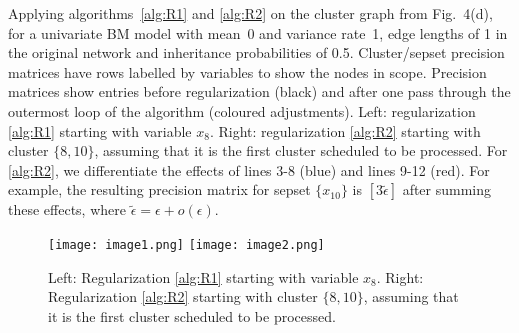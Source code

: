 \documentclass{article}
\begin{document}
Applying algorithms~\ref{alg:R1} and \ref{alg:R2} on the cluster graph from Fig.~4(d), for a univariate BM model with mean~0 and variance rate~1, edge lengths of 1 in the original network and inheritance probabilities of 0.5. Cluster/sepset precision matrices have rows labelled by variables to show the nodes in scope. Precision matrices show entries before regularization (black) and after one pass through the outermost loop of the algorithm (coloured adjustments). Left: regularization \ref{alg:R1} starting with variable $x_8$. Right: regularization \ref{alg:R2} starting with cluster $\{8, 10\}$, assuming that it is the first cluster scheduled to be processed. For \ref{alg:R2}, we differentiate the effects of lines 3-8 (blue) and lines 9-12 (red). For example, the resulting precision matrix for sepset $\{x_{10}\}$ is $[3\tilde{\epsilon}]$ after summing these effects, where $\tilde{\epsilon}=\epsilon+o(\epsilon)$.

\begin{figure}[h]
    \centering
    \texttt{[image: image1.png]}
    \texttt{[image: image2.png]}
    \caption{Left: Regularization \ref{alg:R1} starting with variable $x_8$. Right: Regularization \ref{alg:R2} starting with cluster $\{8, 10\}$, assuming that it is the first cluster scheduled to be processed.}
    \label{fig:cluster_graph}
\end{figure}
\end{document}
